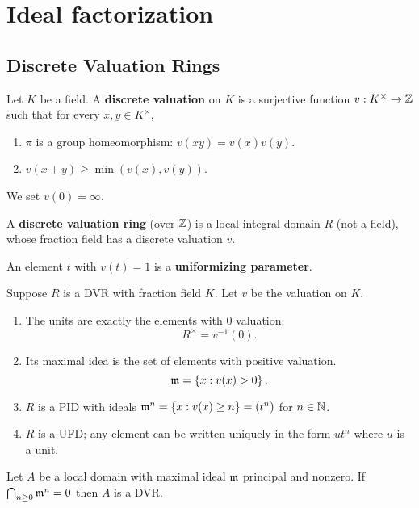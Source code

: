 \chapter{Ideal factorization}

\section{Discrete Valuation Rings}
\begin{df}
Let $K$ be a field. A \textbf{discrete valuation} on $K$ is a surjective function $v:K^{\times}\to\mathbb{Z}$ such that for every $x,y\in K^{\times}$,
\begin{enumerate}
\item $\pi$ is a group homeomorphism: 
$v(xy)=v(x)v(y)$.
\item 
$v(x+y)\geq \min(v(x),v(y))$.
\end{enumerate}
We set $v(0)=\infty$.

A \textbf{discrete valuation ring} (over $\mathbb{Z}$) is a local integral domain $R$ (not a field), whose fraction field has a discrete valuation $v$.

An element $t$ with $v(t)=1$ is a \textbf{uniformizing parameter}.
\end{df}
\begin{pr}
Suppose $R$ is a DVR with fraction field $K$. Let $v$ be the valuation on $K$.
\begin{enumerate}
\item The units are exactly the elements with 0 valuation:
\[R^{\times}=v^{-1}(0).\]
\item %
Its maximal idea is the set of elements with positive valuation.
\[
\mathfrak{m}=\left\{{x}:{v(x)>0}\right\}.
\]
\item 
$R$ is a PID with ideals $\mathfrak{m}^n=\left\{{x}:{v(x)\geq n}\right\}=(t^n)$ for $n\in \mathbb{N}$.
\item
$R$ is a UFD; any element can be written uniquely in the form $ut^n$ where $u$ is a unit.
\end{enumerate}
\end{pr}
\begin{lem}
Let $A$ be a local domain with maximal ideal $\mathfrak{m}$ principal and nonzero. If $\bigcap_{n\geq 0}\mathfrak{m}^n=0$ then $A$ is a DVR.
\end{lem}
